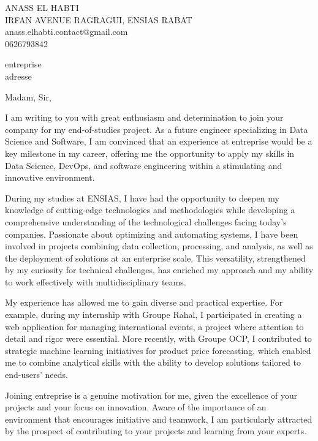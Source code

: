 \documentclass[a4paper,11pt]{letter}
\begin{document}
ANASS EL HABTI \\
IRFAN AVENUE RAGRAGUI, ENSIAS RABAT \\
anass.elhabti.contact@gmail.com \\
0626793842 \\

\vspace{1cm} %

\hfill
\begin{minipage}[t]{0.5\textwidth}
\raggedleft
{entreprise} \\ %
{adresse} \\    %
\end{minipage}

Madam, Sir,

I am writing to you with great enthusiasm and determination to join your company for my end-of-studies project. As a future engineer specializing in Data Science and Software, I am convinced that an experience at {entreprise} would be a key milestone in my career, offering me the opportunity to apply my skills in Data Science, DevOps, and software engineering within a stimulating and innovative environment.

During my studies at ENSIAS, I have had the opportunity to deepen my knowledge of cutting-edge technologies and methodologies while developing a comprehensive understanding of the technological challenges facing today’s companies. Passionate about optimizing and automating systems, I have been involved in projects combining data collection, processing, and analysis, as well as the deployment of solutions at an enterprise scale. This versatility, strengthened by my curiosity for technical challenges, has enriched my approach and my ability to work effectively with multidisciplinary teams.

My experience has allowed me to gain diverse and practical expertise. For example, during my internship with Groupe Rahal, I participated in creating a web application for managing international events, a project where attention to detail and rigor were essential. More recently, with Groupe OCP, I contributed to strategic machine learning initiatives for product price forecasting, which enabled me to combine analytical skills with the ability to develop solutions tailored to end-users’ needs.

Joining {entreprise} is a genuine motivation for me, given the excellence of your projects and your focus on innovation. Aware of the importance of an environment that encourages initiative and teamwork, I am particularly attracted by the prospect of contributing to your projects and learning from your experts.
\end{document}
